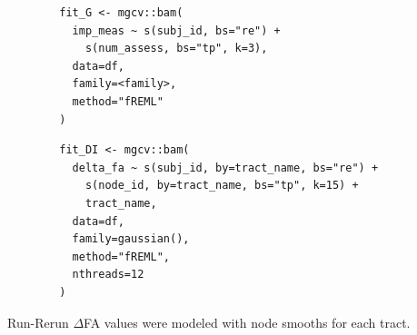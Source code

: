 \documentclass[12pt]{article}
\begin{document}
\begin{equ}[H]
	\begin{lstlisting}
		fit_G <- mgcv::bam(
		  imp_meas ~ s(subj_id, bs="re") +
		    s(num_assess, bs="tp", k=3),
		  data=df,
		  family=<family>,
		  method="fREML"
		)
	\end{lstlisting}
	\caption{ImPACT metrics modeled as a function of number of assessments using a single global smooth. \lstinline{imp_meas} = ImPACT composite or total symptom score, \lstinline{num_assess} = assessment number (1=Base, 2=Post, 3=RTP).}
	\label{supp-code:gam-impact}
\end{equ}


\begin{equ}[H]
	\begin{lstlisting}
		fit_DI <- mgcv::bam(
		  delta_fa ~ s(subj_id, by=tract_name, bs="re") +
		    s(node_id, by=tract_name, bs="tp", k=15) +
		    tract_name,
		  data=df,
		  family=gaussian(),
		  method="fREML",
		  nthreads=12
		)
	\end{lstlisting}
	\caption{Run-Rerun $\Delta$FA values were modeled with node smooths for each tract.}
	\label{supp-code:gam-di}
\end{equ}



\end{document}

